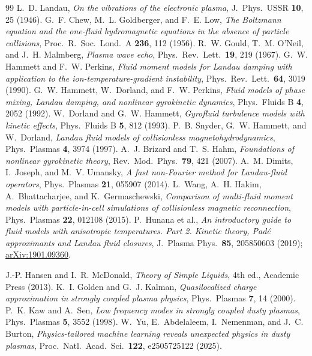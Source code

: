 \begin{thebibliography}{99}
L.~D. Landau,
\emph{On the vibrations of the electronic plasma},
J.\ Phys.\ USSR \textbf{10}, 25 (1946).
G.~F. Chew, M.~L. Goldberger, and F.~E. Low,
\emph{The Boltzmann equation and the one-fluid hydromagnetic equations in
the absence of particle collisions},
Proc.\ R.\ Soc.\ Lond.\ A \textbf{236}, 112 (1956).
R.~W. Gould, T.~M. O'Neil, and J.~H. Malmberg,
\emph{Plasma wave echo},
Phys.\ Rev.\ Lett.\ \textbf{19}, 219 (1967).
G.~W. Hammett and F.~W. Perkins,
\emph{Fluid moment models for Landau damping with application to the
ion-temperature-gradient instability},
Phys.\ Rev.\ Lett.\ \textbf{64}, 3019 (1990).
G.~W. Hammett, W.~Dorland, and F.~W. Perkins,
\emph{Fluid models of phase mixing, Landau damping, and nonlinear
gyrokinetic dynamics},
Phys.\ Fluids B \textbf{4}, 2052 (1992).
W.~Dorland and G.~W. Hammett,
\emph{Gyrofluid turbulence models with kinetic effects},
Phys.\ Fluids B \textbf{5}, 812 (1993).
P.~B. Snyder, G.~W. Hammett, and W.~Dorland,
\emph{Landau fluid models of collisionless magnetohydrodynamics},
Phys.\ Plasmas \textbf{4}, 3974 (1997).
A.~J. Brizard and T.~S. Hahm,
\emph{Foundations of nonlinear gyrokinetic theory},
Rev.\ Mod.\ Phys.\ \textbf{79}, 421 (2007).
A.~M. Dimits, I.~Joseph, and M.~V. Umansky,
\emph{A fast non-Fourier method for Landau-fluid operators},
Phys.\ Plasmas \textbf{21}, 055907 (2014).
L.~Wang, A.~H. Hakim, A.~Bhattacharjee, and K.~Germaschewski,
\emph{Comparison of multi-fluid moment models with particle-in-cell
simulations of collisionless magnetic reconnection},
Phys.\ Plasmas \textbf{22}, 012108 (2015).
P.~Hunana et al.,
\emph{An introductory guide to fluid models with anisotropic temperatures.
Part 2. Kinetic theory, Pad\'e approximants and Landau fluid closures},
J.\ Plasma Phys.\ \textbf{85}, 205850603 (2019);
\href{https://arxiv.org/abs/1901.09360}{arXiv:1901.09360}.

J.-P. Hansen and I.~R. McDonald,
\emph{Theory of Simple Liquids},
4th ed., Academic Press (2013).
K.~I. Golden and G.~J. Kalman,
\emph{Quasilocalized charge approximation in strongly coupled plasma
physics},
Phys.\ Plasmas \textbf{7}, 14 (2000).
P.~K. Kaw and A.~Sen,
\emph{Low frequency modes in strongly coupled dusty plasmas},
Phys.\ Plasmas \textbf{5}, 3552 (1998).
W.~Yu, E.~Abdelaleem, I.~Nemenman, and J.~C. Burton,
\emph{Physics-tailored machine learning reveals unexpected physics in dusty
plasmas},
Proc.\ Natl.\ Acad.\ Sci.\ \textbf{122}, e2505725122 (2025).


\end{thebibliography}
